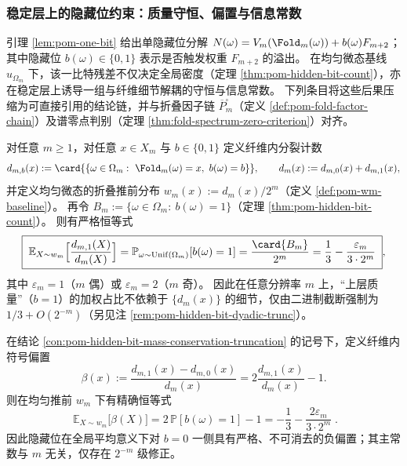 
\subsubsection{稳定层上的隐藏位约束：质量守恒、偏置与信息常数}\label{subsubsec:pom-hidden-bit-stable-layer-conclusions}
引理 \ref{lem:pom-one-bit} 给出单隐藏位分解
\(
N(\omega)=V_m(\Fold_m(\omega))+b(\omega)F_{m+2}
\)；
其中隐藏位 \(b(\omega)\in\{0,1\}\) 表示是否触发权重 \(F_{m+2}\) 的溢出。
在均匀微态基线 \(u_{\Omega_m}\) 下，该一比特残差不仅决定全局密度（定理 \ref{thm:pom-hidden-bit-count}），亦在稳定层上诱导一组与纤维细节解耦的守恒与信息常数。
下列条目将这些后果压缩为可直接引用的结论链，并与折叠因子链 \(\overline P_m^{\square}\)（定义 \ref{def:pom-fold-factor-chain}）及谱零点判别（定理 \ref{thm:fold-spectrum-zero-criterion}）对齐。

\begin{conclusion}\label{con:pom-hidden-bit-mass-conservation-truncation}
对任意 \(m\ge 1\)，对任意 \(x\in X_m\) 与 \(b\in\{0,1\}\) 定义纤维内分裂计数
\[
d_{m,b}(x):=\card{\{\omega\in\Omega_m:\ \Fold_m(\omega)=x,\ b(\omega)=b\}},
\qquad
d_m(x):=d_{m,0}(x)+d_{m,1}(x),
\]
并定义均匀微态的折叠推前分布 \(w_m(x):=d_m(x)/2^m\)（定义 \ref{def:pom-wm-baseline}）。
再令 \(B_m:=\{\omega\in\Omega_m:\ b(\omega)=1\}\)（定理 \ref{thm:pom-hidden-bit-count}）。
则有严格恒等式
\[
\boxed{\;
\mathbb E_{X\sim w_m}\Bigl[\frac{d_{m,1}(X)}{d_m(X)}\Bigr]
=\mathbb P_{\omega\sim\mathrm{Unif}(\Omega_m)}[b(\omega)=1]
=\frac{\card{B_m}}{2^m}
=\frac13-\frac{\varepsilon_m}{3\cdot 2^m}\;},
\]
其中 \(\varepsilon_m=1\)（\(m\) 偶）或 \(\varepsilon_m=2\)（\(m\) 奇）。
因此在任意分辨率 \(m\) 上，“上层质量”（\(b=1\)）的加权占比不依赖于 \(\{d_m(x)\}\) 的细节，仅由二进制截断强制为 \(1/3+O(2^{-m})\)（另见注 \ref{rem:pom-hidden-bit-dyadic-trunc}）。
\end{conclusion}

\begin{conclusion}\label{con:pom-hidden-bit-global-sign-bias}
在结论 \ref{con:pom-hidden-bit-mass-conservation-truncation} 的记号下，定义纤维内符号偏置
\[
\beta(x):=\frac{d_{m,1}(x)-d_{m,0}(x)}{d_m(x)}
=2\frac{d_{m,1}(x)}{d_m(x)}-1.
\]
则在均匀推前 \(w_m\) 下有精确恒等式
\[
\boxed{\;
\mathbb E_{X\sim w_m}\bigl[\beta(X)\bigr]
=2\,\mathbb P[b(\omega)=1]-1
=-\frac13-\frac{2\varepsilon_m}{3\cdot 2^m}\; }.
\]
因此隐藏位在全局平均意义下对 \(b=0\) 一侧具有严格、不可消去的负偏置；其主常数与 \(m\) 无关，仅存在 \(2^{-m}\) 级修正。
\end{conclusion}

